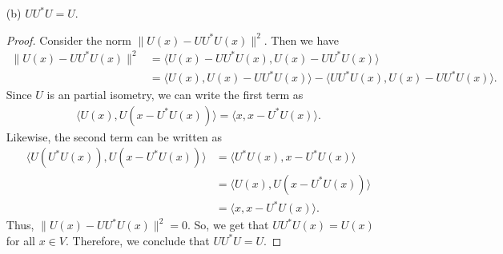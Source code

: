 \begin{enumerate}
\begin{proof}
       \[   N(U^{*}U) = (N(U^{*}U)^{\perp})^{\perp}  = R(U^{*}U)^{\perp}  \]
       which shows the second result.
        \end{proof}
    \item[(b)] \( U U^{*} U = U  \).
        \begin{proof}
        Consider the norm \( \| U(x) - U U^{*} U (x) \|^{2} \). Then we have
        \begin{align*}
            \|U(x) - U U^{*} U (x) \|^{2} &= \langle U(x) - U U^{*} U (x)  ,  U (x) - U U^{*} U(x)  \rangle \\
                                          &=  \langle U(x) , U(x) - U U^{*} U(x)   \rangle - \langle U U^{*} U(x)  , U(x) - U U^{*} U(x)  \rangle.
        \end{align*}
        Since \( U  \) is an partial isometry, we can write the first term as
        \begin{align*}
            \langle U(x)  , U ( x - U^{*}U(x)) \rangle = \langle x  ,  x - U^{*}U(x)  \rangle.
        \end{align*}
        Likewise, the second term can be written as
        \begin{align*}
            \langle U(U^{*}U(x)) , U(x -  U^{*} U(x))  \rangle &= \langle U^{*}U(x)  , x -  U^{*} U(x)  \rangle \\
                                                                &= \langle U(x)  , U(x -  U^{*} U(x)) \rangle \\
                                                                &= \langle x  ,  x -  U^{*} U (x)  \rangle.
        \end{align*}
        Thus, \( \|U(x) - U U^{*} U(x) \|^{2} = 0  \). So, we get that \( U U^{*} U(x) = U(x)  \) for all \( x \in V  \). Therefore, we conclude that \( U U^{*} U = U  \).
        \end{proof}
\end{enumerate}

